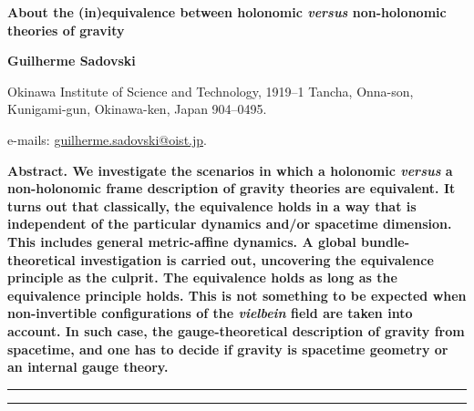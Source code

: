 \documentclass[../main.tex]{subfiles}
\begin{document}
\thispagestyle{empty}
{
  \noindent
  \Large
  \bfseries
  About the (in){}equivalence between holonomic \textit{versus} non-holonomic theories of gravity
  \bigskip
  \bigskip
}

{
  \noindent
  \bfseries
  Guilherme Sadovski
  \bigskip
}

{
  \noindent
  \footnotesize
  Okinawa Institute of Science and Technology, 1919--1 Tancha, Onna-son, Kunigami-gun, Okinawa-ken, Japan 904--0495.
  \bigskip
}

{
  \noindent
  \footnotesize
  \rmfamily
  e-mails: \href{mailto:guilherme.sadovski@oist.jp}{guilherme.sadovski@oist.jp}.
  \bigskip
}

{
  \noindent
  \bfseries
  Abstract.\normalfont{} We investigate the scenarios in which a holonomic \textit{versus} a non-holonomic frame description of gravity theories are equivalent. It turns out that classically, the equivalence holds in a way that is independent of the particular dynamics and/or spacetime dimension. This includes general metric-affine dynamics. A global bundle-theoretical investigation is carried out, uncovering the equivalence principle as the culprit. The equivalence holds as long as the equivalence principle holds. This is not something to be expected when non-invertible configurations of the \textit{vielbein} field are taken into account. In such case, the gauge-theoretical description of gravity  from spacetime, and one has to decide if gravity is spacetime geometry or an internal gauge theory.
  \bigskip
}

{
  \noindent
  \rule{\textwidth}{1pt}
  \vspace{-4.5ex}
  \tableofcontents
  \noindent
  \rule{\textwidth}{1pt}
}
\end{document}
